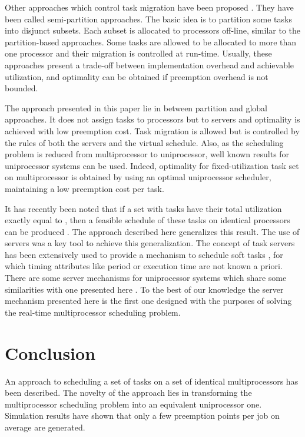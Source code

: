 \documentclass[twocolumn, compsocconf]{IEEEtran}
\newcounter{proc}
\begin{document}
Other approaches which control task migration have been proposed
\cite{Andersson08, Easwaran09, Kato09, Massa10}. They have been called
semi-partition approaches. The basic idea is to partition some tasks into
disjunct subsets. Each subset is allocated to processors off-line, similar to
the partition-based approaches. Some tasks are allowed to be allocated to more
than one processor and their migration is controlled at run-time. Usually, these
approaches present a trade-off between implementation overhead and achievable
utilization, and optimality can be obtained if preemption overhead is not
bounded.

The approach presented in this paper lie in between partition and global
approaches. It does not assign tasks to processors but to servers and optimality
is achieved with low preemption cost. Task migration is allowed but is
controlled by the rules of both the servers and the virtual schedule. Also, as
the scheduling problem is reduced from multiprocessor to uniprocessor, well
known results for uniprocessor systems can be used. Indeed, optimality for
fixed-utilization task set on multiprocessor is obtained by using an optimal
uniprocessor scheduler, maintaining a low preemption cost per task.


It has recently been noted that if a set with  tasks have their total
utilization exactly equal to , then a feasible schedule of these tasks on 
identical processors can be produced \cite{Levin09}. The approach described here
generalizes this result. The use of servers was a key tool to achieve this
generalization. The concept of task servers has been extensively used to provide
a mechanism to schedule soft tasks \cite{liu00}, for which timing attributes
like period or execution time are not known a priori. There are some server
mechanisms for uniprocessor systems which share some similarities with one
presented here \cite{DLS97,SB96}. To the best of our knowledge the server
mechanism presented here is the first one designed with the purposes of solving
the real-time multiprocessor scheduling problem.

\section{Conclusion}\label{sec:conclusion}

An approach to scheduling a set of tasks on a set of identical multiprocessors
has been described. The novelty of the approach lies in transforming the
multiprocessor scheduling problem into an equivalent uniprocessor
one. Simulation results have shown that only a few preemption points per job on
average are generated.
\end{document}

